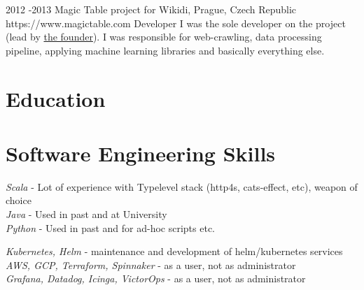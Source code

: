 \documentclass[10pt]{article} %
\begin{document}

    \job
    {2012 -}{2013}
    {Magic Table project for Wikidi, Prague, Czech Republic}
    {https://www.magictable.com}
    {Developer}
    {I was the sole developer on the project (lead by \href{https://michal.illich.cz/}{the founder}). I was responsible for web-crawling, data processing pipeline, applying machine learning libraries and basically everything else. \\
    }




    \section{Education}




    \section{Software Engineering Skills}

    {
        \textit{Scala} - Lot of experience with Typelevel stack (http4s, cats-effect, etc), weapon of choice\\
    \textit{Java} - Used in past and at University\\
    \textit{Python} - Used in past and for ad-hoc scripts etc.\\
    }


    {
        \textit{Kubernetes, Helm} - maintenance and development of helm/kubernetes services\\
        \textit{AWS, GCP, Terraform, Spinnaker} - as a user, not as administrator \\
    \textit{Grafana, Datadog, Icinga, VictorOps} - as a user, not as administrator \\
    }
\end{document}
